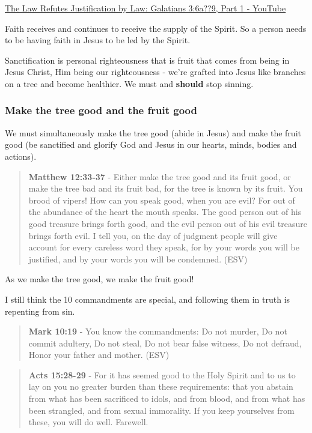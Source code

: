 \documentclass[11pt]{article}
\begin{document}
\href{https://www.youtube.com/watch?v=34pBf5pZq\_I}{The Law Refutes Justification by Law: Galatians 3:6a??9, Part 1 - YouTube}

Faith receives and continues to receive the supply of the Spirit. So a person needs to be having faith in Jesus to be led by the Spirit.

Sanctification is personal righteousness that is fruit that comes from being in Jesus Christ, Him being our righteousness - we're grafted into Jesus like branches on a tree and become healthier. We must and \textbf{should} stop sinning.

\subsubsection{Make the tree good and the fruit good}
\label{sec:orgdb3167a}

We must simultaneously make the tree good (abide in Jesus) and make the fruit good (be sanctified and glorify God and Jesus in our hearts, minds, bodies and actions).

\begin{quote}
\textbf{Matthew 12:33-37} - Either make the tree good and its fruit good, or make the tree bad and its fruit bad, for the tree is known by its fruit. You brood of vipers! How can you speak good, when you are evil? For out of the abundance of the heart the mouth speaks. The good person out of his good treasure brings forth good, and the evil person out of his evil treasure brings forth evil. I tell you, on the day of judgment people will give account for every careless word they speak, for by your words you will be justified, and by your words you will be condemned. (ESV)
\end{quote}

As we make the tree good, we make the fruit good!

I still think the 10 commandments are special, and following them in truth is repenting from sin.

\begin{quote}
\textbf{Mark 10:19} - You know the commandments: Do not murder, Do not commit adultery, Do not steal, Do not bear false witness, Do not defraud, Honor your father and mother. (ESV)
\end{quote}

\begin{quote}
\textbf{Acts 15:28-29} - For it has seemed good to the Holy Spirit and to us to lay on you no greater burden than these requirements: that you abstain from what has been sacrificed to idols, and from blood, and from what has been strangled, and from sexual immorality. If you keep yourselves from these, you will do well. Farewell.
\end{quote}
\end{document}
